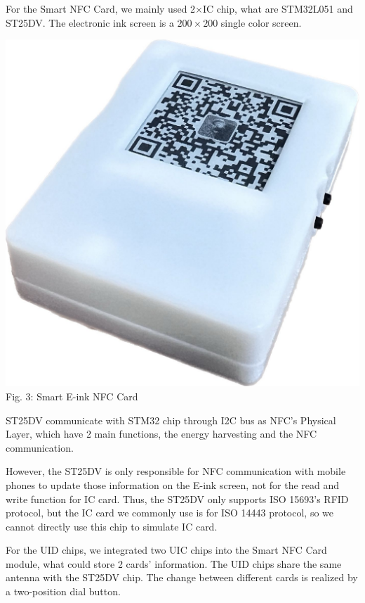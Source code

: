 \documentclass[11pt, a4paper]{article}
\begin{document}
For the Smart NFC Card, we mainly used 2$\times$IC chip, what are STM32L051 and ST25DV. The electronic ink screen is a $200 \times 200$ single color screen.

\begin{center}

    \includegraphics[scale=0.2]{pic4.jpg} \\
    Fig. 3: Smart E-ink NFC Card

\end{center}


ST25DV communicate with STM32 chip through I2C bus as NFC's Physical Layer, which have 2 main functions, the energy harvesting and the NFC communication.

However, the ST25DV is only responsible for NFC communication with mobile phones to update those information on the E-ink screen, not for the read and write function for IC card. Thus, the ST25DV only supports ISO 15693's RFID protocol, but the IC card we commonly use is for ISO 14443 protocol, so we cannot directly use this chip to simulate IC card.

For the UID chips, we integrated two UIC chips into the Smart NFC Card module, what could store 2 cards' information. The UID chips share the same antenna with the ST25DV chip. The change between different cards is realized by a two-position dial button.
\end{document}

